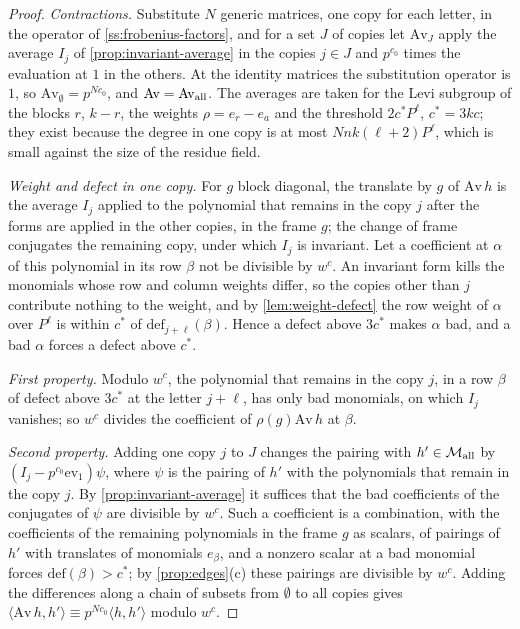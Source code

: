 \begin{proof}
\emph{Contractions.} Substitute $N$ generic matrices, one copy for each letter, in the operator of \cref{ss:frobenius-factors}, and for a set $J$ of copies let $\mathrm{Av}_J$ apply the average $I_j$ of \cref{prop:invariant-average} in the copies $j\in J$ and $p^{c_0}$ times the evaluation at $1$ in the others. At the identity matrices the substitution operator is $1$, so $\mathrm{Av}_\emptyset=p^{Nc_0}$, and $\mathrm{Av}=\mathrm{Av}_{\rm all}$.
The averages are taken for the Levi subgroup of the blocks $r$, $k-r$, the weights $\rho=e_r-e_a$ and the threshold $2c^*P^\ell$, $c^*=3kc$; they exist because the degree in one copy is at most $Nnk(\ell+2)P^\ell$, which is small against the size of the residue field.

\emph{Weight and defect in one copy.} For $g$ block diagonal, the translate by $g$ of $\mathrm{Av}\,h$ is the average $I_j$ applied to the polynomial that remains in the copy $j$ after the forms are applied in the other copies, in the frame $g$; the change of frame conjugates the remaining copy, under which $I_j$ is invariant. Let a coefficient at $\alpha$ of this polynomial in its row $\beta$ not be divisible by $w^c$. An invariant form
kills the monomials whose row and column weights differ, so the copies other than $j$ contribute nothing to the weight, and by \cref{lem:weight-defect} the row weight of $\alpha$ over $P^\ell$ is within $c^*$ of $\mathrm{def}_{j+\ell}(\beta)$. Hence a defect above $3c^*$ makes $\alpha$ bad, and a bad $\alpha$ forces a defect above $c^*$.

\emph{First property.} Modulo $w^c$, the polynomial that remains in the copy $j$, in a row $\beta$ of defect above $3c^*$ at the letter $j+\ell$, has only bad monomials, on which $I_j$ vanishes; so $w^c$ divides the coefficient of $\rho(g)\mathrm{Av}\,h$ at $\beta$.

\emph{Second property.} Adding one copy $j$ to $J$ changes the pairing with $h'\in\mathcal M_{\rm all}$ by $(I_j-p^{c_0}\mathrm{ev}_1)\psi$, where $\psi$ is the pairing of $h'$ with the polynomials that remain in the copy $j$. By \cref{prop:invariant-average} it suffices that the bad coefficients of the conjugates of $\psi$ are divisible by $w^c$. Such a coefficient is a combination, with the coefficients of the remaining polynomials in the frame $g$
as scalars, of pairings of $h'$ with translates of monomials $e_\beta$, and a nonzero scalar at a bad monomial forces $\mathrm{def}(\beta)>c^*$; by \cref{prop:edges}(c) these pairings are divisible by $w^c$. Adding the differences along a chain of subsets from $\emptyset$ to all copies gives $\langle\mathrm{Av}\,h,h'\rangle\equiv p^{Nc_0}\langle h,h'\rangle$ modulo $w^c$.
\end{proof}

